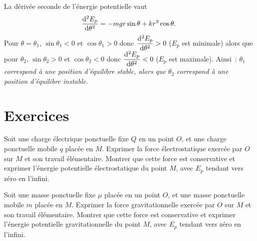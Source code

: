 La dérivée seconde de l'énergie potentielle vaut
\begin{equation}%
  \deriveds{E_p}{\theta} = -mgr\sin\theta +kr^2\cos\theta.
\end{equation}%
Pour \(\theta=\theta_1\), \(\sin\theta_1<0\) et \(\cos\theta_1>0\) donc 
\(\dfrac{\mathrm{d}^2 E_p}{\mathrm{d} {\theta}^2}>0\) (\(E_p\) est minimale) alors que pour 
\(\theta_2\), \(\sin\theta_2>0\) et \(\cos\theta_2<0\) donc 
\(\dfrac{\mathrm{d}^2 E_p}{\mathrm{d} {\theta}^2}<0\) (\(E_p\) est maximale). Ainsi~: \emph{\(\theta_1\) 
correspond à une position d'équilibre stable, alors que \(\theta_2\) correspond 
à une position d'équilibre instable.}
\clearpage
\section{Exercices}%
\label{chap4-sec:exercices}%
\begin{exercice}%
  Soit une charge électrique ponctuelle fixe \(Q\) en un point \(O\), et une 
  charge ponctuelle mobile \(q\) placée en \(M\). Exprimer la force 
  électrostatique exercée par \(O\) sur \(M\) et son travail élémentaire. 
  Montrer que cette force est conservative et exprimer l'énergie potentielle 
  électrostatique du point \(M\), avec \(E_p\) tendant vers zéro en l'infini.
\end{exercice}%
%
\begin{exercice}%
  Soit une masse ponctuelle fixe \(\mu\) placée en un point \(O\), et une masse 
  ponctuelle mobile \(m\) placée en \(M\). Exprimer la force gravitationnelle 
  exercée par \(O\) sur \(M\) et son travail élémentaire. Montrer que cette 
  force est conservative et exprimer l'énergie potentielle gravitationnelle du 
  point \(M\), avec \(E_p\) tendant vers zéro en l'infini.
\end{exercice}%
%
